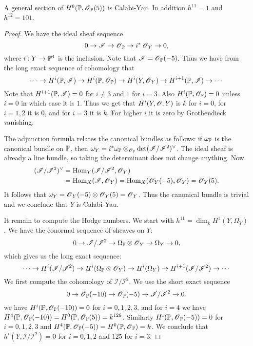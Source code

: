 \documentclass[11pt, english]{article}
\begin{document}
\begin{prop}
A general section of $H^0(\mathbb{P},\operatorname{\mathscr{O}}_{\mathbb{P}}(5))$ is Calabi-Yau. In addition $h^{11}=1$ and $h^{12}=101$.
\end{prop}
\begin{proof}
We have the ideal sheaf sequence
$$
0 \to \mathscr I \to \operatorname{\mathscr{O}}_{\mathbb{P}} \to i^\ast \operatorname{\mathscr{O}}_Y \to 0,
$$
where $i:Y \to \mathbb{P}^4$ is the inclusion. Note that $\mathscr I = \operatorname{\mathscr{O}}_{\mathbb{P}}(-5)$. Thus we have from the long exact sequence of cohomology that
$$
\cdots \to H^i(\mathbb{P}, \mathscr I) \to H^i(\mathbb{P},\operatorname{\mathscr{O}}_{\mathbb{P}}) \to H^i(Y,\operatorname{\mathscr{O}}_Y) \to H^{i+1}(\mathbb{P},\mathscr I) \to \cdots
$$
Note that $H^{i+1}(\mathbb{P},\mathscr I) = 0$ for $i \neq 3$ and $1$ for $i=3$. Also $H^i(\mathbb{P},\operatorname{\mathscr{O}}_{\mathbb{P}})=0$ unless $i=0$ in which case it is $1$. Thus we get that $H^i(Y,\operatorname{\mathscr{O}},Y)$ is $k$ for $i=0$, for $i=1,2$ it is $0$, and for $i=3$ it is $k$. For higher $i$ it is zero by Grothendieck vanishing.

The adjunction formula relates the canonical bundles as follows: if $\omega_{\mathbb{P}}$ is the canonical bundle on $\mathbb{P}$, then $\omega_Y = i^\ast \omega_{\mathbb{P}} \otimes_{\operatorname{\mathscr{O}}_{\mathbb{P}}} \det(\mathscr I/\mathscr I^2)^\vee$. The ideal sheaf is already a line bundle, so taking the determinant does not change anything. Now
\begin{align*}
(\mathscr I/\mathscr I^2)^\vee &= \operatorname{Hom}_Y(\mathscr I/\mathscr I^2,\operatorname{\mathscr{O}}_Y) \\
&= \operatorname{Hom}_X(\mathscr I,\operatorname{\mathscr{O}}_Y)=\operatorname{Hom}_X(\operatorname{\mathscr{O}}_Y(-5),\operatorname{\mathscr{O}}_Y)=\operatorname{\mathscr{O}}_Y(5).
\end{align*}
It follows that $\omega_Y = \operatorname{\mathscr{O}}_Y(-5) \otimes \operatorname{\mathscr{O}}_Y(5)=\operatorname{\mathscr{O}}_Y$. Thus the canonical bundle is trivial and we conclude that $Y$ is Calabi-Yau.

It remain to compute the Hodge numbers. We start with $h^{11} = \dim_k H^1(Y,\Omega_Y)$. We have the conormal sequence of sheaves on $Y$:
$$
0 \to \mathscr I / \mathscr I^2 \to \Omega_{\mathbb{P}} \otimes \operatorname{\mathscr{O}}_Y \to \Omega_Y \to 0,
$$
which gives us the long exact sequence:
$$
\cdots \to H^i(\mathscr I/\mathscr I^2) \to H^i(\Omega_{\mathbb{P}} \otimes \operatorname{\mathscr{O}}_Y) \to H^i(\Omega_Y) \to H^{i+1}(\mathscr I/\mathscr I^2) \to \cdots 
$$
We first compute the cohomology of $\mathscr I/\mathscr I^2$. We use the short exact sequence
\begin{equation}
\label{normaleq}
0 \to \operatorname{\mathscr{O}}_{\mathbb{P}}(-10) \to \operatorname{\mathscr{O}}_{\mathbb{P}}(-5) \to \mathscr I / \mathscr I^2 \to 0.
\end{equation}
we have $H^i(\mathbb{P},\operatorname{\mathscr{O}}_{\mathbb{P}}(-10))=0$ for $i=0,1,2,3$, and for $i=4$ we have $H^4(\mathbb{P},\operatorname{\mathscr{O}}_{\mathbb{P}}(-10))=H^0(\mathbb{P},\operatorname{\mathscr{O}}_{\mathbb{P}}(5))=k^{126}$. Similarly $H^i(\mathbb{P},\operatorname{\mathscr{O}}_{\mathbb{P}}(-5))=0$ for $i=0,1,2,3$ and $H^4(\mathbb{P},\operatorname{\mathscr{O}}_{\mathbb{P}}(-5))=H^0(\mathbb{P},\operatorname{\mathscr{O}}_{\mathbb{P}})=k$. We conclude that $h^i(Y,\mathscr I/\mathscr I^2) = 0$ for $i=0,1,2$ and $125$ for $i=3$.


\end{proof}
\end{document}

